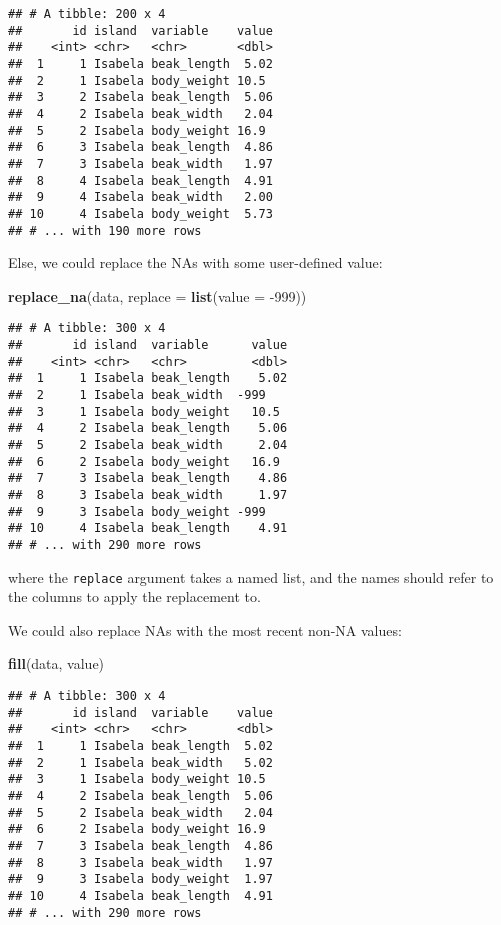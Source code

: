 \documentclass[
]{book}
\newenvironment{Shaded}{}{}
\newcommand{\DataTypeTok}[1]{\textcolor[rgb]{0.56,0.13,0.00}{#1}}
\newcommand{\DecValTok}[1]{\textcolor[rgb]{0.25,0.63,0.44}{#1}}
\newcommand{\KeywordTok}[1]{\textcolor[rgb]{0.00,0.44,0.13}{\textbf{#1}}}
\newcommand{\NormalTok}[1]{#1}
\begin{document}
\begin{verbatim}
## # A tibble: 200 x 4
##       id island  variable    value
##    <int> <chr>   <chr>       <dbl>
##  1     1 Isabela beak_length  5.02
##  2     1 Isabela body_weight 10.5 
##  3     2 Isabela beak_length  5.06
##  4     2 Isabela beak_width   2.04
##  5     2 Isabela body_weight 16.9 
##  6     3 Isabela beak_length  4.86
##  7     3 Isabela beak_width   1.97
##  8     4 Isabela beak_length  4.91
##  9     4 Isabela beak_width   2.00
## 10     4 Isabela body_weight  5.73
## # ... with 190 more rows
\end{verbatim}

Else, we could replace the NAs with some user-defined value:

\begin{Shaded}
\begin{Highlighting}[]
\KeywordTok{replace_na}\NormalTok{(data, }\DataTypeTok{replace =} \KeywordTok{list}\NormalTok{(}\DataTypeTok{value =} \DecValTok{-999}\NormalTok{))}
\end{Highlighting}
\end{Shaded}

\begin{verbatim}
## # A tibble: 300 x 4
##       id island  variable      value
##    <int> <chr>   <chr>         <dbl>
##  1     1 Isabela beak_length    5.02
##  2     1 Isabela beak_width  -999   
##  3     1 Isabela body_weight   10.5 
##  4     2 Isabela beak_length    5.06
##  5     2 Isabela beak_width     2.04
##  6     2 Isabela body_weight   16.9 
##  7     3 Isabela beak_length    4.86
##  8     3 Isabela beak_width     1.97
##  9     3 Isabela body_weight -999   
## 10     4 Isabela beak_length    4.91
## # ... with 290 more rows
\end{verbatim}

where the \texttt{replace} argument takes a named list, and the names should refer to the columns to apply the replacement to.

We could also replace NAs with the most recent non-NA values:

\begin{Shaded}
\begin{Highlighting}[]
\KeywordTok{fill}\NormalTok{(data, value)}
\end{Highlighting}
\end{Shaded}

\begin{verbatim}
## # A tibble: 300 x 4
##       id island  variable    value
##    <int> <chr>   <chr>       <dbl>
##  1     1 Isabela beak_length  5.02
##  2     1 Isabela beak_width   5.02
##  3     1 Isabela body_weight 10.5 
##  4     2 Isabela beak_length  5.06
##  5     2 Isabela beak_width   2.04
##  6     2 Isabela body_weight 16.9 
##  7     3 Isabela beak_length  4.86
##  8     3 Isabela beak_width   1.97
##  9     3 Isabela body_weight  1.97
## 10     4 Isabela beak_length  4.91
## # ... with 290 more rows
\end{verbatim}
\end{document}
